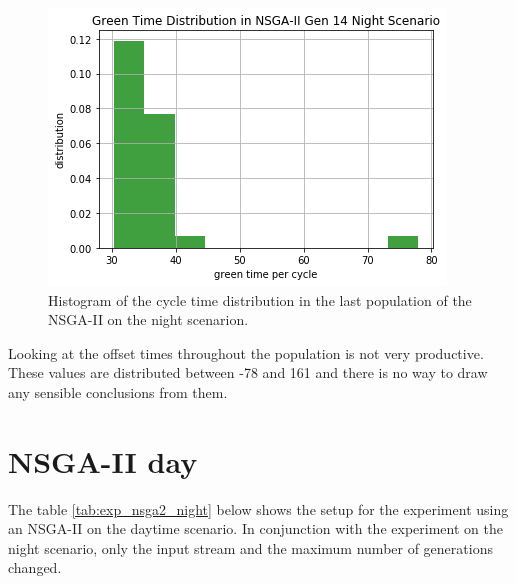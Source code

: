 \documentclass[./\jobname.tex]{subfiles}
\begin{document}
\begin{figure}[H]
	\centering
	\includegraphics[width=\textwidth]{../img/png/nsga2_night_cycl_distr.png}
	\caption{Histogram of the cycle time distribution in the last population of the NSGA-II on the night scenarion.}
	\label{fig:exp_nsga2_night_cycle_histo}
\end{figure}

Looking at the offset times throughout the population is not very productive. These values are distributed between -78 and 161 and there is no way to draw any sensible conclusions from them. 


\section{NSGA-II day}

The table \ref{tab:exp_nsga2_night} below shows the setup for the experiment using an NSGA-II on the daytime scenario. In conjunction with the experiment on the night scenario, only the input stream and the maximum number of generations changed. 

\begin{table}[H]
	\centering
	\noindent{}
	\label{tab:exp_nsga2_day}
\end{table}
\end{document}

